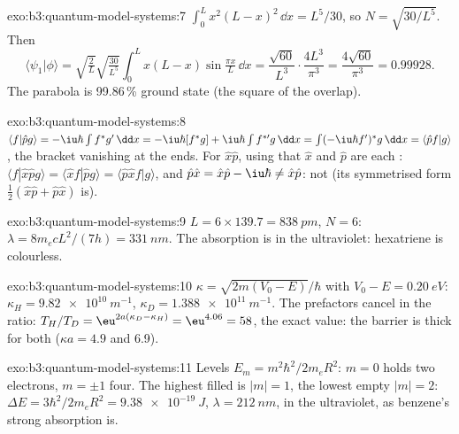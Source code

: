 \begin{solution}{exo:b3:quantum-model-systems:7}
$\int_0^Lx^2(L - x)^2\,\dd x = L^5/30$, so $N = \sqrt{30/L^5}$. Then
\[
\langle\psi_1|\phi\rangle = \sqrt{\tfrac2L}\sqrt{\tfrac{30}{L^5}}\int_0^Lx(L -
x)\sin\tfrac{\pi x}{L}\,\dd x = \frac{\sqrt{60}}{L^3}\cdot\frac{4L^3}{\pi^3} =
\frac{4\sqrt{60}}{\pi^3} = 0.99928 .
\]
The parabola is 99.86\,\% ground state (the square of the overlap).
\end{solution}

\begin{solution}{exo:b3:quantum-model-systems:8}
$\langle f|\hat pg\rangle = -\iu\hbar\int f^*g'\,\dd x = -\iu\hbar[f^*g] +
\iu\hbar\int f^{*\prime}g\,\dd x = \int(-\iu\hbar f')^*g\,\dd x = \langle\hat
pf|g\rangle$, the bracket vanishing at the ends. For $\hat x\hat p$, using that $\hat x$ and $\hat p$ are each :
$\langle f|\hat x\hat pg\rangle = \langle\hat xf|\hat pg\rangle = \langle\hat p\hat
xf|g\rangle$, and $\hat p\hat x = \hat x\hat p - \iu\hbar \ne \hat x\hat p$: not
 (its symmetrised form $\frac12(\hat x\hat p + \hat p\hat x)$ is).
\end{solution}

\begin{solution}{exo:b3:quantum-model-systems:9}
$L = 6 \times 139.7 = \qty{838}{pm}$, $N = 6$: $\lambda = 8m_ecL^2/(7h) =
\qty{331}{nm}$. The absorption is in the ultraviolet: hexatriene is
colourless.
\end{solution}

\begin{solution}{exo:b3:quantum-model-systems:10}
$\kappa = \sqrt{2m(V_0 - E)}/\hbar$ with $V_0 - E = \qty{0.20}{eV}$:
$\kappa_H = \qty{9.82e10}{m^{-1}}$, $\kappa_D = \qty{1.388e11}{m^{-1}}$. The
prefactors cancel in the ratio: $T_H/T_D = \eu^{2a(\kappa_D - \kappa_H)} =
\eu^{4.06} = 58$, the exact value: the barrier is thick for both
($\kappa a = 4.9$ and 6.9).
\end{solution}

\begin{solution}{exo:b3:quantum-model-systems:11}
Levels $E_m = m^2\hbar^2/2m_eR^2$: $m = 0$ holds two electrons, $m = \pm1$
four. The highest filled is $|m| = 1$, the lowest empty $|m| = 2$: $\Delta E =
3\hbar^2/2m_eR^2 = \qty{9.38e-19}{J}$, $\lambda = \qty{212}{nm}$, in the
ultraviolet, as benzene's strong absorption is.
\end{solution}

